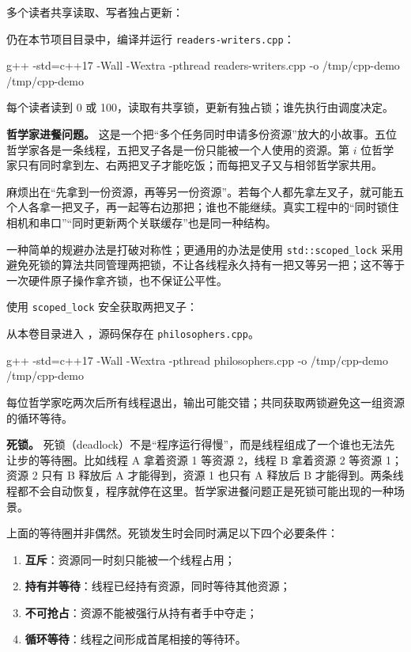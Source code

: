 \begin{example}
多个读者共享读取、写者独占更新：



仍在本节项目目录中，编译并运行 \texttt{readers-writers.cpp}：
\begin{tbash}
g++ -std=c++17 -Wall -Wextra -pthread readers-writers.cpp -o /tmp/cpp-demo
/tmp/cpp-demo
\end{tbash}
每个读者读到 0 或 100，读取有共享锁，更新有独占锁；谁先执行由调度决定。
\end{example}

\textbf{哲学家进餐问题。}
这是一个把“多个任务同时申请多份资源”放大的小故事。五位哲学家各是一条线程，五把叉子各是一份只能被一个人使用的资源。第 $i$ 位哲学家只有同时拿到左、右两把叉子才能吃饭；而每把叉子又与相邻哲学家共用。

麻烦出在“先拿到一份资源，再等另一份资源”。若每个人都先拿左叉子，就可能五个人各拿一把叉子，再一起等右边那把；谁也不能继续。真实工程中的“同时锁住相机和串口”“同时更新两个关联缓存”也是同一种结构。

一种简单的规避办法是打破对称性；更通用的办法是使用 \texttt{std::scoped\_lock} 采用避免死锁的算法共同管理两把锁，不让各线程永久持有一把又等另一把；这不等于一次硬件原子操作拿齐锁，也不保证公平性。

\begin{example}
使用 \texttt{scoped\_lock} 安全获取两把叉子：



从本卷目录进入 ，源码保存在 \texttt{philosophers.cpp}。
\begin{tbash}
g++ -std=c++17 -Wall -Wextra -pthread philosophers.cpp -o /tmp/cpp-demo
/tmp/cpp-demo
\end{tbash}
每位哲学家吃两次后所有线程退出，输出可能交错；共同获取两锁避免这一组资源的循环等待。
\end{example}

\textbf{死锁。}
死锁（deadlock）不是“程序运行得慢”，而是线程组成了一个谁也无法先让步的等待圈。比如线程 A 拿着资源 1 等资源 2，线程 B 拿着资源 2 等资源 1；资源 2 只有 B 释放后 A 才能得到，资源 1 也只有 A 释放后 B 才能得到。两条线程都不会自动恢复，程序就停在这里。哲学家进餐问题正是死锁可能出现的一种场景。

上面的等待圈并非偶然。死锁发生时会同时满足以下四个必要条件：
\begin{enumerate}
    \item \textbf{互斥}：资源同一时刻只能被一个线程占用；
    \item \textbf{持有并等待}：线程已经持有资源，同时等待其他资源；
    \item \textbf{不可抢占}：资源不能被强行从持有者手中夺走；
    \item \textbf{循环等待}：线程之间形成首尾相接的等待环。
\end{enumerate}

